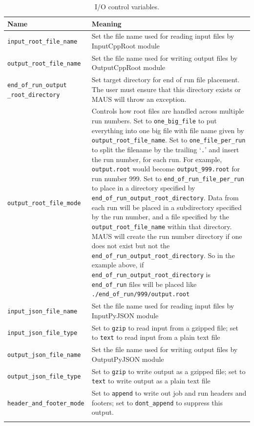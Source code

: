 \begin{table}
\begin{center}
\caption{I/O control variables.}
\begin{tabular}{p{4cm}|p{11cm}}
Name & Meaning \\
\hline
\verb|input_root_file_name| & Set the file name used for reading input files by InputCppRoot module \\
\verb|output_root_file_name| & Set the file name used for writing output files by OutputCppRoot module  \\
\verb|end_of_run_output| \verb|_root_directory| & Set target directory for end of run file placement. The user must ensure that this directory exists or MAUS will throw an exception. \\
\verb|output_root_file_mode| & Controls how root files are handled across multiple run numbers. Set to \verb|one_big_file| to put everything into one big file with file name given by \verb|output_root_file_name|. Set to \verb|one_file_per_run| to split the filename by the trailing `\verb|.|' and insert the run number, for each run. For example, \verb|output.root| would become \verb|output_999.root| for run number 999. Set to \verb|end_of_run_file_per_run| to place in a directory specified by \verb|end_of_run_output_root_directory|. Data from each run will be placed in a subdirectory specified by the run number, and a file specified by the \verb|output_root_file_name| within that directory. MAUS will create the run number directory if one does not exist but not the \verb|end_of_run_output_root_directory|. So in the example above, if \verb|end_of_run_output_root_directory| is \verb|end_of_run| files will be placed like \verb|./end_of_run/999/output.root| \\
\hline
\verb|input_json_file_name| & Set the file name used for reading input files by InputPyJSON module \\
\verb|input_json_file_type| & Set to \verb|gzip| to read input from a gzipped file; set to \verb|text| to read input from a plain text file \\
\verb|output_json_file_name| & Set the file name used for writing output files by OutputPyJSON module \\
\verb|output_json_file_type| & Set to \verb|gzip| to write output as a gzipped file; set to \verb|text| to write output as a plain text file  \\
\hline
\verb|header_and_footer_mode| & Set to \verb|append| to write out job and run headers and footers; set to \verb|dont_append| to suppress this output. \\
\begin{makeimage} %
\end{makeimage} 
\end{tabular}
\end{center}
\end{table}

